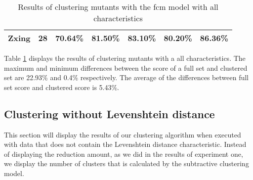 \documentclass[../../main]{subfiles}
\begin{document}
\begin{table}[!htb]
\begin{tabular}{|l|l|l|l|l|l|l|}
Zxing                 & 28                   & 70.64\%                           & 81.50\%                                                & 83.10\%                            & 80.20\%                                                                                                                                    & 86.36\%                                                                                                                                    \\ \hline
\end{tabular}
\caption{\label{tab:ml_full}Results of clustering mutants with the \acrshort{fcm} model with all characteristics}
\end{table}
\FloatBarrier
Table \ref{tab:ml_full} displays the results of clustering mutants with a all characteristics.
The maximum and minimum differences between the score of a full set and clustered set are 22.93\% and 0.4\% respectively.
The average of the differences between full set score and clustered score is 5.43\%.


\subsection{Clustering without Levenshtein distance}
This section will display the results of our clustering algorithm when executed with data that does not contain the Levenshtein distance characteristic. 
Instead of displaying the reduction amount, as we did in the results of experiment one, we display the number of clusters that is calculated by the subtractive clustering model.
\end{document}
